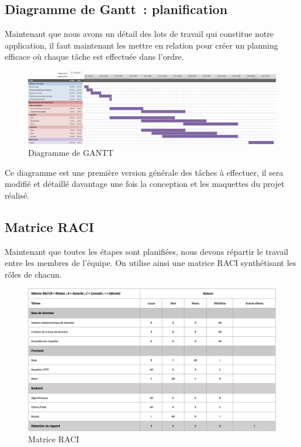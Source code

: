 \documentclass[french,a4paper]{article}
\begin{document}
\subsection{Diagramme de Gantt~: planification}
Maintenant que nous avons un détail des lots de travail qui constitue notre application, il faut maintenant les mettre en relation pour créer un planning efficace où chaque tâche est effectuée dans l’ordre.
\begin{figure}[H]
    \centering
    \includegraphics[width=1\textwidth]{img/gantt.png}
    \caption{Diagramme de GANTT}
\end{figure} 
Ce diagramme est une première version générale des tâches à effectuer, il sera modifié et détaillé davantage une fois la conception et les maquettes du projet réalisé.

\subsection{Matrice RACI}
Maintenant que toutes les étapes sont planifiées, nous devons répartir le travail entre les membres de l’équipe. On utilise ainsi une matrice RACI synthétisant les rôles de chacun.

\begin{figure}[H]
    \centering
    \includegraphics[width=1\textwidth]{img/RACI.png}
    \caption{Matrice RACI}
\end{figure} 
\end{document}
